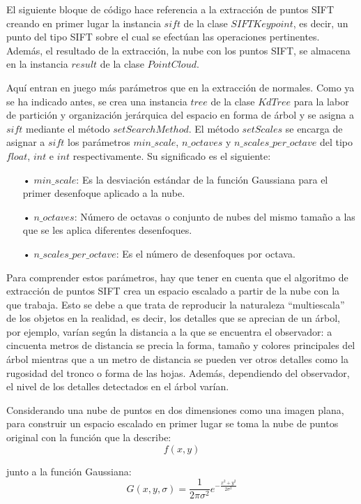 El siguiente bloque de código hace referencia a la extracción de puntos SIFT creando en primer lugar la instancia $sift$ de la clase $SIFTKeypoint$, es decir, un punto del tipo SIFT sobre el cual se efectúan las operaciones pertinentes. Además, el resultado de la extracción, la nube con los puntos SIFT, se almacena en la instancia $result$ de la clase $PointCloud$.

Aquí entran en juego más parámetros que en la extracción de normales. Como ya se ha indicado antes, se crea una instancia $tree$ de la clase $KdTree$ para la labor de partición y organización jerárquica del espacio en forma de árbol y se asigna a $sift$ mediante el método $setSearchMethod$.
El método $setScales$ se encarga de asignar a $sift$ los parámetros $min\_scale$, $n\_octaves$ y $n\_scales\_per\_octave$ del tipo $float$, $int$ e $int$ respectivamente. Su significado es el siguiente:

\begin{itemize}
\item[•]$min\_scale$: Es la desviación estándar de la función Gaussiana para el primer desenfoque aplicado a la nube.
\item[•]$n\_octaves$: Número de octavas o conjunto de nubes del mismo tamaño a las que se les aplica diferentes desenfoques.
\item[•]$n\_scales\_per\_octave$: Es el número de desenfoques por octava.
\end{itemize}

Para comprender estos parámetros, hay que tener en cuenta que el algoritmo de extracción de puntos SIFT crea un espacio escalado a partir de la nube con la que trabaja. Esto se debe a que trata de reproducir la naturaleza ``multiescala'' de los objetos en la realidad, es decir, los detalles que se aprecian de un árbol, por ejemplo, varían según la distancia a la que se encuentra el observador: a cincuenta metros de distancia se precia la forma, tamaño y colores principales del árbol mientras que a un metro de distancia se pueden ver otros detalles como la rugosidad del tronco o forma de las hojas. Además, dependiendo del observador, el nivel de los detalles detectados en el árbol varían.

Considerando una nube de puntos en dos dimensiones como una imagen plana, para construir un espacio escalado en primer lugar se toma la nube de puntos original con la función que la describe: 
$$f(x,y)$$ 

junto a la función Gaussiana:
$$G(x,y,\sigma)=\frac{1}{2\pi\sigma^2}e^{-\frac{x^2+y^2}{2\sigma^2}}$$

